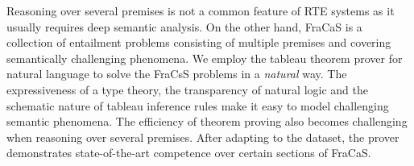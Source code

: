 Reasoning over several premises is not a common feature of RTE systems as it usually requires deep semantic analysis. On the other hand, FraCaS is a collection of entailment problems consisting of multiple premises and covering semantically challenging phenomena. We employ the tableau theorem prover for natural language to solve the FraCsS problems in a {\em natural} way. The expressiveness of a type theory, the transparency of natural logic and the schematic nature of tableau inference rules make it easy to model challenging semantic phenomena. The efficiency of theorem proving also becomes challenging when reasoning over several premises. After adapting to the dataset, the prover demonstrates state-of-the-art competence over certain sections of FraCaS.
